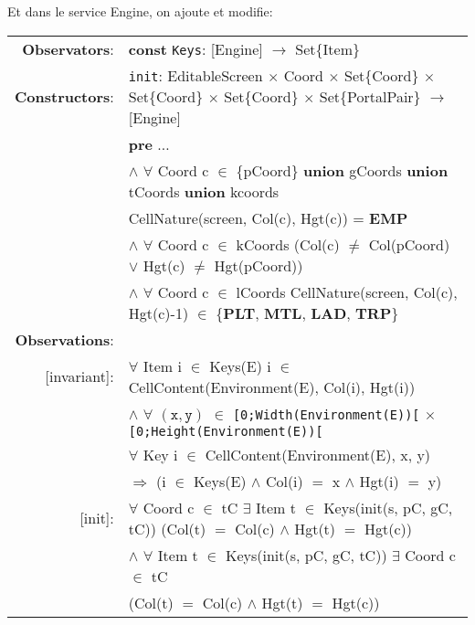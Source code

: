 \documentclass[8pt]{article}
\begin{document}
Et dans le service \textrm{Engine}, on ajoute et modifie:
{\small
  \begin{longtable}{rl}
    \textbf{Observators}: & \textbf{const} \texttt{Keys}: \textrm{[Engine]} $\rightarrow$ \textrm{Set\{Item\}} \\
    \textbf{Constructors}: &\texttt{init}: \textrm{EditableScreen} $\times$ \textrm{Coord} $\times$ \textrm{Set\{Coord\}} $\times$ \textrm{Set\{Coord\}} $\times$ \textrm{Set\{Coord\}} $\times$ \textrm{Set\{PortalPair\}} $\rightarrow$ \textrm{[Engine]} \\
    & \quad \textbf{pre} $\ldots$\\
    & \quad\quad\quad $\land$ $\forall$ \textrm{Coord} c $\in$ \{pCoord\} \textbf{union} gCoords \textbf{union} tCoords \textbf{union} kcoords\\
    & \quad\quad\quad\quad\quad \textrm{CellNature(screen, Col(c), Hgt(c))} = \textbf{EMP} \\
    & \quad\quad\quad $\land$ $\forall$ \textrm{Coord} c $\in$ kCoords (\textrm{Col(c)} $\neq$ \textrm{Col(pCoord)} $\lor$ \textrm{Hgt(c)} $\neq$ \textrm{Hgt(pCoord)})\\
    & \quad\quad\quad $\land$ $\forall$ \textrm{Coord} c $\in$ lCoords \textrm{CellNature(screen, Col(c), Hgt(c)-1)} $\in$ \{\textbf{PLT}, \textbf{MTL}, \textbf{LAD}, \textbf{TRP}\} \\
    \textbf{Observations}: &\\
    \textrm{[invariant]}: & $\forall$ \textrm{Item} i $\in$ \textrm{Keys(E)} i $\in$ \textrm{CellContent(Environment(E), Col(i), Hgt(i))}\\
    & \quad\quad $\land$ $\forall$ $(\mathtt{x},\mathtt{y})$ $\in$ \texttt{[0;Width(Environment(E))[} $\times$ \texttt{[0;Height(Environment(E))[}\\
    & \quad\quad\quad\quad $\forall$ \textrm{Key} i $\in$ \textrm{CellContent(Environment(E), x, y)} \\
    & \quad\quad\quad\quad\quad\quad $\Rightarrow$ (i $\in$ \textrm{Keys(E)} $\land$ \textrm{Col(i)} $=$ x $\land$ \textrm{Hgt(i)} $=$ y)\\
    \textrm{[init]}: & $\forall$ \textrm{Coord} c $\in$ tC $\exists$ \textrm{Item} t $\in$ \textrm{Keys(init(s, pC, gC, tC))} (\textrm{Col(t)} $=$ \textrm{Col(c)} $\land$ \textrm{Hgt(t)} $=$ \textrm{Hgt(c)})\\
  & \quad\quad $\land$ $\forall$ \textrm{Item} t $\in$ \textrm{Keys(init(s, pC, gC, tC))} $\exists$ \textrm{Coord} c $\in$ tC\\
  & \quad\quad\quad\quad (\textrm{Col(t)} $=$ \textrm{Col(c)} $\land$ \textrm{Hgt(t)} $=$ \textrm{Hgt(c)})\\

\end{longtable}}
\end{document}
